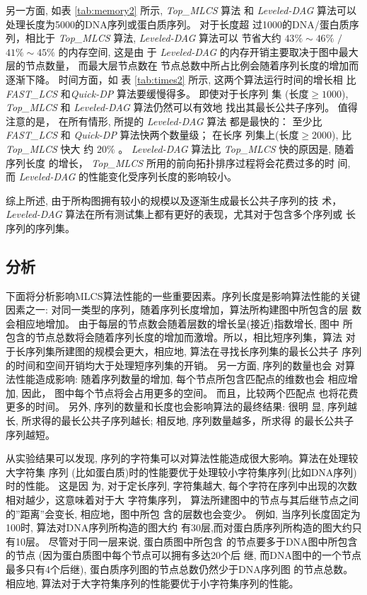 另一方面, 如表 \ref{tab:memory2} 所示, \emph{Top\_MLCS} 算法
和 \emph{Leveled-DAG} 算法可以处理长度为5000的DNA序列或蛋白质序列。 对于长度超
过1000的DNA/蛋白质序列，相比于 \emph{Top\_MLCS} 算法, \emph{Leveled-DAG} 算法可以
节省大约 $43\% \sim 46\%$ $/$ $41\% \sim 45\%$ 的内存空间, 这是由
于 \emph{Leveled-DAG} 的内存开销主要取决于图中最大层的节点数量， 而最大层节点数在
节点总数中所占比例会随着序列长度的增加而逐渐下降。 时间方面，如
表 \ref{tab:times2} 所示, 这两个算法运行时间的增长相
比 \emph{FAST\_LCS} 和\emph{Quick-DP} 算法要缓慢得多。 即使对于长序列
集 ($长度 \geq 1000$), \emph{Top\_MLCS} 和 \emph{Leveled-DAG} 算法仍然可以有效地
找出其最长公共子序列。 值得注意的是， 在所有情形, 所提的 \emph{Leveled-DAG} 算法
都是最快的： 至少比 \emph{FAST\_LCS} 和 \emph{Quick-DP} 算法快两个数量级； 在长序
列集上($长度 \geq 2000$), 比 \emph{Top\_MLCS} 快大
约 $20\%$ 。 \emph{Leveled-DAG} 算法比 \emph{Top\_MLCS} 快的原因是, 随着序列长度
的增长， \emph{Top\_MLCS} 所用的前向拓扑排序过程将会花费过多的时
间, 而 \emph{Leveled-DAG} 的性能变化受序列长度的影响较小。

综上所述, 由于所构图拥有较小的规模以及逐渐生成最长公共子序列的技
术， \emph{Leveled-DAG} 算法在所有测试集上都有更好的表现，尤其对于包含多个序列或
长序列的序列集。

\subsection{分析}

下面将分析影响MLCS算法性能的一些重要因素。序列长度是影响算法性能的关键
因素之一: 对同一类型的序列，随着序列长度增加，算法所构建图中所包含的层
数会相应地增加。 由于每层的节点数会随着层数的增长呈(接近)指数增长, 图中
所包含的节点总数将会随着序列长度的增加而激增。所以，相比短序列集，算法
对于长序列集所建图的规模会更大，相应地, 算法在寻找长序列集的最长公共子
序列的时间和空间开销均大于处理短序列集的开销。 另一方面, 序列的数量也会
对算法性能造成影响: 随着序列数量的增加, 每个节点所包含匹配点的维数也会
相应增加, 因此， 图中每个节点将会占用更多的空间。 而且，比较两个匹配点
也将花费更多的时间。 另外, 序列的数量和长度也会影响算法的最终结果: 很明
显, 序列越长, 所求得的最长公共子序列越长; 相反地, 序列数量越多，所求得
的最长公共子序列越短。

从实验结果可以发现, 序列的字符集可以对算法性能造成很大影响。算法在处理较大字符集
序列 (比如蛋白质)时的性能要优于处理较小字符集序列(比如DNA序列)时的性能。 这是因
为, 对于定长序列, 字符集越大, 每个字符在序列中出现的次数相对越少，这意味着对于大
字符集序列， 算法所建图中的节点与其后继节点之间的''距离''会变长, 相应地，图中所包
含的层数也会变少。 例如, 当序列长度固定为100时, 算法对DNA序列所构造的图大约
有30层,而对蛋白质序列所构造的图大约只有10层。 尽管对于同一层来说, 蛋白质图中所包含
的节点要多于DNA图中所包含的节点 (因为蛋白质图中每个节点可以拥有多达20个后
继, 而DNA图中的一个节点最多只有4个后继), 蛋白质序列图的节点总数仍然少于DNA序列图
的节点总数。 相应地, 算法对于大字符集序列的性能要优于小字符集序列的性能。

